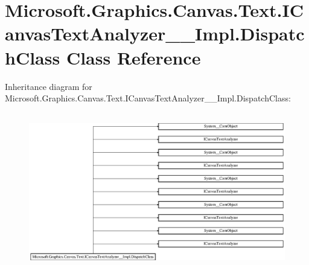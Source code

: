 \hypertarget{class_microsoft_1_1_graphics_1_1_canvas_1_1_text_1_1_i_canvas_text_analyzer_____impl_1_1_dispatch_class}{}\section{Microsoft.\+Graphics.\+Canvas.\+Text.\+I\+Canvas\+Text\+Analyzer\+\_\+\+\_\+\+Impl.\+Dispatch\+Class Class Reference}
\label{class_microsoft_1_1_graphics_1_1_canvas_1_1_text_1_1_i_canvas_text_analyzer_____impl_1_1_dispatch_class}
Inheritance diagram for Microsoft.\+Graphics.\+Canvas.\+Text.\+I\+Canvas\+Text\+Analyzer\+\_\+\+\_\+\+Impl.\+Dispatch\+Class\+:\begin{figure}[H]
\begin{center}
\leavevmode
\includegraphics[height=6.905830cm]{class_microsoft_1_1_graphics_1_1_canvas_1_1_text_1_1_i_canvas_text_analyzer_____impl_1_1_dispatch_class}
\end{center}
\end{figure}
